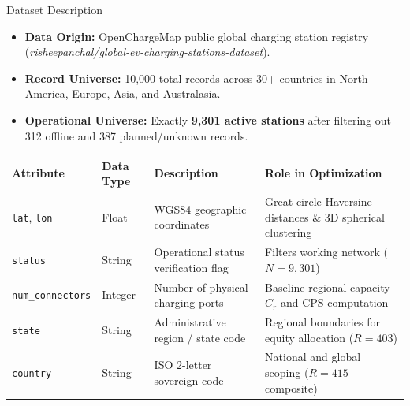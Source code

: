 \documentclass[aspectratio=169,10pt]{beamer}
\begin{document}
\begin{frame}{Dataset Description}
  \vspace{0.1cm}
  \begin{itemize}\setlength{\itemsep}{0.12cm}
    \item \textbf{Data Origin:} OpenChargeMap public global charging station registry (\textit{risheepanchal/global-ev-charging-stations-dataset}).
    \item \textbf{Record Universe:} 10,000 total records across 30+ countries in North America, Europe, Asia, and Australasia.
    \item \textbf{Operational Universe:} Exactly \textbf{9,301 active stations} after filtering out 312 offline and 387 planned/unknown records.
  \end{itemize}
  \vspace{0.15cm}
  \begin{table}[h]
    \centering
    \scriptsize
    \renewcommand{\arraystretch}{1.2}
    \begin{tabular}{p{2.5cm}p{1.8cm}p{4.2cm}p{4.2cm}}
      \toprule
      \textbf{Attribute} & \textbf{Data Type} & \textbf{Description} & \textbf{Role in Optimization} \\
      \midrule
      \texttt{lat}, \texttt{lon} & Float & WGS84 geographic coordinates & Great-circle Haversine distances \& 3D spherical clustering \\
      \texttt{status} & String & Operational status verification flag & Filters working network ($N = 9,301$) \\
      \texttt{num\_connectors} & Integer & Number of physical charging ports & Baseline regional capacity $C_r$ and CPS computation \\
      \texttt{state} & String & Administrative region / state code & Regional boundaries for equity allocation ($R = 403$) \\
      \texttt{country} & String & ISO 2-letter sovereign code & National and global scoping ($R = 415$ composite) \\
      \bottomrule
    \end{tabular}
  \end{table}
\end{frame}
\end{document}
